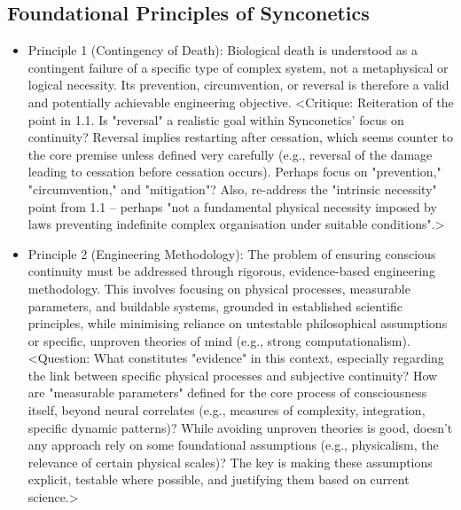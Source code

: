 \documentclass[10pt]{article}
\begin{document}
\begin{sloppypar}
\begin{itemize}
  \end{itemize}

  \subsection{Foundational Principles of Synconetics}
  \label{sec:foundational-principles}

  \begin{itemize}

    \item Principle 1 (Contingency of Death): Biological death is understood as a contingent failure of a specific type of complex system, not a metaphysical or logical necessity. Its prevention, circumvention, or reversal is therefore a valid and potentially achievable engineering objective. <Critique: Reiteration of the point in 1.1. Is "reversal" a realistic goal within Synconetics' focus on continuity? Reversal implies restarting after cessation, which seems counter to the core premise unless defined very carefully (e.g., reversal of the damage leading to cessation before cessation occurs). Perhaps focus on "prevention," "circumvention," and "mitigation"? Also, re-address the "intrinsic necessity" point from 1.1 – perhaps "not a fundamental physical necessity imposed by laws preventing indefinite complex organisation under suitable conditions".>

    \item Principle 2 (Engineering Methodology): The problem of ensuring conscious continuity must be addressed through rigorous, evidence-based engineering methodology. This involves focusing on physical processes, measurable parameters, and buildable systems, grounded in established scientific principles, while minimising reliance on untestable philosophical assumptions or specific, unproven theories of mind (e.g., strong computationalism). <Question: What constitutes "evidence" in this context, especially regarding the link between specific physical processes and subjective continuity? How are "measurable parameters" defined for the core process of consciousness itself, beyond neural correlates (e.g., measures of complexity, integration, specific dynamic patterns)? While avoiding unproven theories is good, doesn't any approach rely on some foundational assumptions (e.g., physicalism, the relevance of certain physical scales)? The key is making these assumptions explicit, testable where possible, and justifying them based on current science.>


\end{itemize}
\end{sloppypar}
\end{document}
